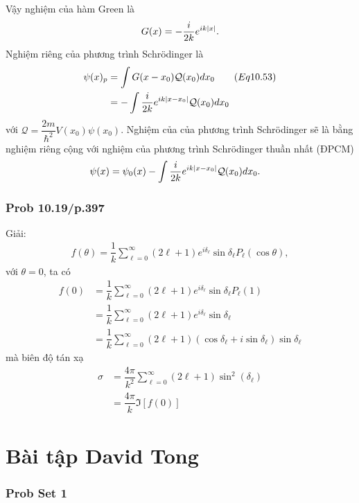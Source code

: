 \documentclass{report}
\renewcommand{\l}{\ell}
\newcommand{\f}[2]{\dfrac{#1}{#2}}
\begin{document}
Vậy nghiệm của hàm Green là
\begin{align*}
	G(x) = -\f{i}{2k} e^{ik\abs{x}}.
\end{align*}
Nghiệm riêng của phương trình Schr\"{o}dinger là
\begin{align*}
	\psi(x)_{p}
	 & = \int G(x - x_0) \mathcal{Q}(x_0) dx_0 \quad \quad (Eq 10.53) \\
	 & = -\int \f{i}{2k} e^{ik\abs{x-x_0}} \mathcal{Q}(x_0) dx_0
\end{align*}
với $\mathcal{Q}  = \f{2m}{\hbar^2}V(x_0) \psi(x_0)$.
Nghiệm của của phương trình Schr\"{o}dinger sẽ là bằng nghiệm riêng cộng với nghiệm của phương trình Schr\"{o}dinger thuần nhất (ĐPCM)
\begin{align*}
	\psi(x)
	 & = \psi_0(x) - \int \f{i}{2k} e^{ik\abs{x-x_0}} \mathcal{Q}(x_0) dx_0 .
\end{align*}
\subsubsection{Prob 10.19/p.397}
Giải:
\begin{align*}
	f(\theta) = \f{1}{k} \sum_{\l = 0}^{\infty} (2\l + 1) e^{i\delta_{\l}}\sin \delta_{\l} P_{\l}(\cos\theta),
\end{align*}
với $\theta =  0$, ta có
\begin{align*}
	f(0)
	 & = \f{1}{k} \sum_{\l = 0}^{\infty} (2\l + 1) e^{i\delta_{\l}}\sin \delta_{\l} P_{\l}(1)              \\
	 & = \f{1}{k} \sum_{\l = 0}^{\infty} (2\l + 1) e^{i\delta_{\l}}\sin \delta_{\l}                        \\
	 & = \f{1}{k} \sum_{\l = 0}^{\infty} (2\l + 1) (\cos \delta_{\l} + i \sin \delta_{\l})\sin \delta_{\l}
\end{align*}
mà biên độ tán xạ
\begin{align*}
	\sigma
	 & = \f{4\pi}{k^2} \sum_{\l = 0}^{\infty}(2\l + 1) \sin^{2}(\delta_{\l}) \\
	 & = \f{4\pi}{k} \Im\left[f(0)\right]
\end{align*}

\section{Bài tập David Tong}
\subsubsection{Prob Set 1}
\end{document}

